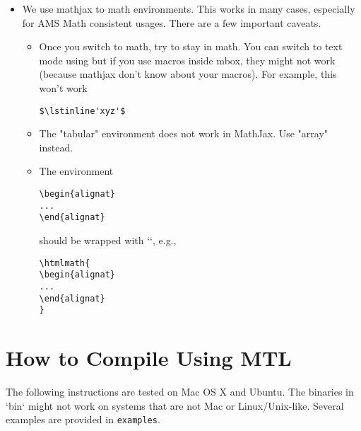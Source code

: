\begin{itemize}
\item We use mathjax to math environments.  This works in many cases, especially for AMS Math consistent usages.  There are a few important caveats. 

\begin{itemize}
\item Once you switch to math, try to stay in math.  You can switch to text mode using \mbox{} but if you use macros inside mbox, they might not work (because mathjax don't know about your macros).  For example, this won't work 
\begin{lstlisting}
$\lstinline'xyz'$
\end{lstlisting}

\item The "tabular" environment does not work in MathJax.  Use "array" instead.

\item  The environment 
\begin{lstlisting}
\begin{alignat} 
... 
\end{alignat}
\end{lstlisting}
%
should be wrapped with `\htmlmath`, e.g.,
%
\begin{lstlisting}
\htmlmath{
\begin{alignat} 
... 
\end{alignat}
}
\end{lstlisting} 
\end{itemize}
\end{itemize}
  

\section{How to Compile Using MTL}

The following instructions are tested on Mac OS X and Ubuntu.  The binaries in `bin` might not work on systems that are not Mac or Linux/Unix-like.  Several  examples are provided in \lstinline`examples`.


